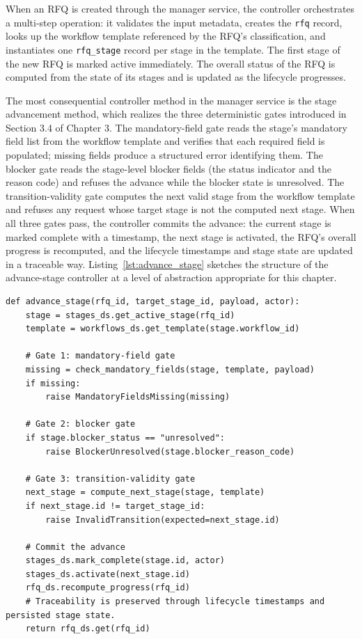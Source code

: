 When an RFQ is created through the manager service, the controller orchestrates a multi-step operation: it validates the input metadata, creates the \texttt{rfq} record, looks up the workflow template referenced by the RFQ's classification, and instantiates one \texttt{rfq\_stage} record per stage in the template. The first stage of the new RFQ is marked active immediately. The overall status of the RFQ is computed from the state of its stages and is updated as the lifecycle progresses.

The most consequential controller method in the manager service is the stage advancement method, which realizes the three deterministic gates introduced in Section 3.4 of Chapter 3. The mandatory-field gate reads the stage's mandatory field list from the workflow template and verifies that each required field is populated; missing fields produce a structured error identifying them. The blocker gate reads the stage-level blocker fields (the status indicator and the reason code) and refuses the advance while the blocker state is unresolved. The transition-validity gate computes the next valid stage from the workflow template and refuses any request whose target stage is not the computed next stage. When all three gates pass, the controller commits the advance: the current stage is marked complete with a timestamp, the next stage is activated, the RFQ's overall progress is recomputed, and the lifecycle timestamps and stage state are updated in a traceable way. Listing~\ref{lst:advance_stage} sketches the structure of the advance-stage controller at a level of abstraction appropriate for this chapter.

\begin{lstlisting}[caption={Structure of the stage advancement controller method (illustrative).}, label={lst:advance_stage}, basicstyle=\ttfamily\small, frame=single, breaklines=true]
def advance_stage(rfq_id, target_stage_id, payload, actor):
    stage = stages_ds.get_active_stage(rfq_id)
    template = workflows_ds.get_template(stage.workflow_id)

    # Gate 1: mandatory-field gate
    missing = check_mandatory_fields(stage, template, payload)
    if missing:
        raise MandatoryFieldsMissing(missing)

    # Gate 2: blocker gate
    if stage.blocker_status == "unresolved":
        raise BlockerUnresolved(stage.blocker_reason_code)

    # Gate 3: transition-validity gate
    next_stage = compute_next_stage(stage, template)
    if next_stage.id != target_stage_id:
        raise InvalidTransition(expected=next_stage.id)

    # Commit the advance
    stages_ds.mark_complete(stage.id, actor)
    stages_ds.activate(next_stage.id)
    rfq_ds.recompute_progress(rfq_id)
    # Traceability is preserved through lifecycle timestamps and persisted stage state.
    return rfq_ds.get(rfq_id)
\end{lstlisting}

